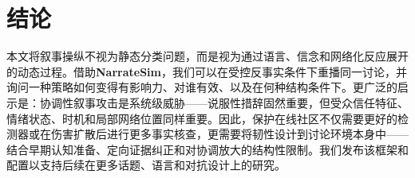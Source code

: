 \section{结论}
\label{sec:conclusion}

本文将叙事操纵不视为静态分类问题，而是视为通过语言、信念和网络化反应展开的动态过程。借助\textbf{NarrateSim}，我们可以在受控反事实条件下重播同一讨论，并询问一种策略如何变得有影响力、对谁有效、以及在何种结构条件下。更广泛的启示是：协调性叙事攻击是系统级威胁——说服性措辞固然重要，但受众信任特征、情绪状态、时机和局部网络位置同样重要。因此，保护在线社区不仅需要更好的检测器或在伤害扩散后进行更多事实核查，更需要将韧性设计到讨论环境本身中——结合早期认知准备、定向证据纠正和对协调放大的结构性限制。我们发布该框架和配置以支持后续在更多话题、语言和对抗设计上的研究。
